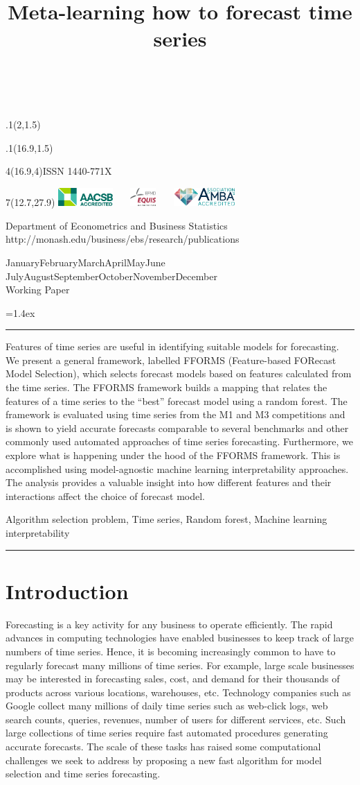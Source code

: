 \documentclass[11pt,a4paper,]{article}
\title{Meta-learning how to forecast time series}
\date{\sf\Date~\Month~\Year}
\makeatletter
\def\Date{\number\day}
\def\Month{\ifcase\month\or
 January\or February\or March\or April\or May\or June\or
 July\or August\or September\or October\or November\or December\fi}
\def\Year{\number\year}
\def\showjel{{\large\textsf{\textbf{JEL classification:}}~\@jel}}
\def\cover{{\sffamily\setcounter{page}{0}
        \thispagestyle{empty}
        \placefig{2}{1.5}{width=5cm}{monash2}
        \placefig{16.9}{1.5}{width=2.1cm}{MBusSchool}
        \begin{textblock}{4}(16.9,4)ISSN 1440-771X\end{textblock}
        \begin{textblock}{7}(12.7,27.9)\hfill
        \includegraphics[height=0.7cm]{AACSB}~~~
        \includegraphics[height=0.7cm]{EQUIS}~~~
        \includegraphics[height=0.7cm]{AMBA}
        \end{textblock}
        \vspace*{2cm}
        \begin{center}\Large
        Department of Econometrics and Business Statistics\\[.5cm]
        \footnotesize http://monash.edu/business/ebs/research/publications
        \end{center}\vspace{2cm}
        \begin{center}
        \fbox{\parbox{14cm}{\begin{onehalfspace}\centering\Huge\vspace*{0.3cm}
                \textsf{\textbf{\expandafter{\@title}}}\vspace{1cm}\par
                \LARGE\@author\end{onehalfspace}
        }}
        \end{center}
        \vfill
                \begin{center}\Large
                \Month~\Year\\[1cm]
                Working Paper \@wp
        \end{center}\vspace*{2cm}}}
\def\pageone{{\sffamily\setstretch{1}%
        \thispagestyle{empty}%
        \vbox to \textheight{%
        \raggedright\baselineskip=1.2cm
     {\fontsize{24.88}{30}\sffamily\textbf{\expandafter{\@title}}}
        \vspace{2cm}\par
        \hspace{1cm}\parbox{14cm}{\sffamily\large\@addresses}\vspace{1cm}\vfill
        \hspace{1cm}{\large\Date~\Month~\Year}\\[1cm]
        \hspace{1cm}\showjel\vss}}}
\def\blindtitle{{\sffamily
     \thispagestyle{plain}\raggedright\baselineskip=1.2cm
     {\fontsize{24.88}{30}\sffamily\textbf{\expandafter{\@title}}}\vspace{1cm}\par
        }}
\def\titlepage{{\cover\newpage\pageone\newpage\blindtitle}}
\let\maketitle\titlepage
\newenvironment{keywords}{\par\vspace{0.5cm}\noindent{\sffamily\textbf{Keywords:}}}{\vspace{0.25cm}\par\hrule\vspace{0.5cm}\par}
\renewenvironment{abstract}{\begin{minipage}{\textwidth}\parskip=1.4ex\noindent
\hrule\vspace{0.1cm}\par{\sffamily\textbf{\abstractname}}\newline}
  {\end{minipage}}
\def\placefig#1#2#3#4{\begin{textblock}{.1}(#1,#2)\rlap{\texttt{[image: \#4]}}\end{textblock}}
\makeatother
\begin{document}
\maketitle
\begin{abstract}
Features of time series are useful in identifying suitable models for forecasting. We present a general framework, labelled FFORMS (Feature-based FORecast Model Selection), which selects forecast models based on features calculated from the time series. The FFORMS framework builds a mapping that relates the features of a time series to the ``best'' forecast model using a random forest. The framework is evaluated using time series from the M1 and M3 competitions and is shown to yield accurate forecasts comparable to several benchmarks and other commonly used automated approaches of time series forecasting. Furthermore, we explore what is happening under the hood of the FFORMS framework. This is accomplished using model-agnostic machine learning interpretability approaches. The analysis provides a valuable insight into how different features and their interactions affect the choice of forecast model.
\end{abstract}
\begin{keywords}
Algorithm selection problem, Time series, Random forest, Machine learning interpretability
\end{keywords}

\hypertarget{introduction}{%
\section{Introduction}\label{introduction}}

Forecasting is a key activity for any business to operate efficiently. The rapid advances in computing technologies have enabled businesses to keep track of large numbers of time series. Hence, it is becoming increasingly common to have to regularly forecast many millions of time series. For example, large scale businesses may be interested in forecasting sales, cost, and demand for their thousands of products across various locations, warehouses, etc. Technology companies such as Google collect many millions of daily time series such as web-click logs, web search counts, queries, revenues, number of users for different services, etc. Such large collections of time series require fast automated procedures generating accurate forecasts. The scale of these tasks has raised some computational challenges we seek to address by proposing a new fast algorithm for model selection and time series forecasting.
\end{document}
